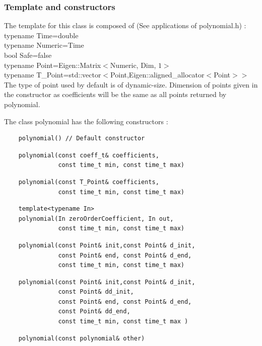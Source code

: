 \documentclass{article}
\begin{document}
    \subsubsection{Template and constructors}
    
    The template for this class is composed of (See applications of polynomial.h) :\\ 
    typename Time=double\\
    typename Numeric=Time\\
    bool Safe=false\\
    typename Point=Eigen::Matrix$<$Numeric, Dim, $1>$\\
    typename T\_Point=std::vector$<$Point,Eigen::aligned\_allocator$<$Point$> >$\\
    The type of point used by default is of dynamic-size. Dimension of points given in the constructor as coefficients will be the same as all points returned by polynomial.
        
    The class polynomial has the following constructors :
    \begin{lstlisting}
    polynomial() // Default constructor
    \end{lstlisting}
    \begin{lstlisting}
    polynomial(const coeff_t& coefficients, 
               const time_t min, const time_t max)
    \end{lstlisting}
    \begin{lstlisting}
    polynomial(const T_Point& coefficients, 
               const time_t min, const time_t max)
    \end{lstlisting}
    \begin{lstlisting}
    template<typename In>
    polynomial(In zeroOrderCoefficient, In out, 
               const time_t min, const time_t max)
    \end{lstlisting}
    \begin{lstlisting}
    polynomial(const Point& init,const Point& d_init, 
               const Point& end, const Point& d_end,
               const time_t min, const time_t max)
    \end{lstlisting}
    \begin{lstlisting}
    polynomial(const Point& init,const Point& d_init,
               const Point& dd_init, 
               const Point& end, const Point& d_end,
               const Point& dd_end,
               const time_t min, const time_t max )
    \end{lstlisting}
    \begin{lstlisting}
    polynomial(const polynomial& other)
    \end{lstlisting}
    
\end{document}
